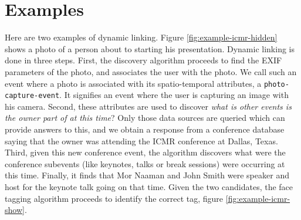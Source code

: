 \section{Examples}
Here are two examples of dynamic linking. Figure \ref{fig:example-icmr-hidden} shows a photo of a person about to starting his presentation. Dynamic linking is done in three steps. First, the discovery algorithm proceeds to find the EXIF parameters of the photo, and associates the user with the photo. We call such an event where a photo is associated with its spatio-temporal attributes, a \texttt{photo-capture-event}. It signifies an event where the user is capturing an image with his camera. Second, these attributes are used to discover \textit{what is other events is the owner part of at this time}? Only those data sources are queried which can provide answers to this, and we obtain a response from a conference database saying that the owner was attending the ICMR conference at Dallas, Texas. Third, given this new conference event, the algorithm discovers what were the conference subevents (like keynotes, talks or break sessions) were occurring at this time. Finally, it finds that Mor Naaman and John Smith were speaker and host for the keynote talk going on that time. Given the two candidates, the face tagging algorithm proceeds to identify the correct tag, figure \ref{fig:example-icmr-show}.


